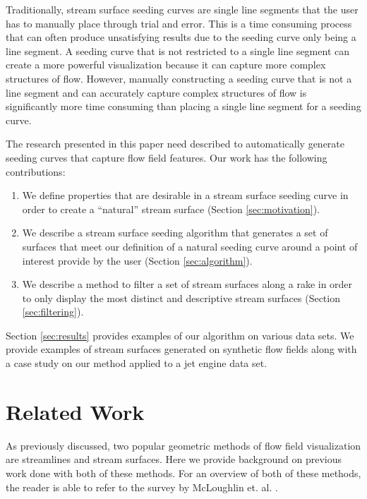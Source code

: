 \documentclass{vgtc}                          %
\begin{document}
Traditionally, stream surface seeding curves are single line segments that the user has to manually place through trial and error.
This is a time consuming process that can often produce unsatisfying results due to the seeding curve only being a line segment. 
A seeding curve that is not restricted to a single line segment can create a more powerful visualization because it can capture more complex structures of flow.
However, manually constructing a seeding curve that is not a line segment and can accurately capture complex structures of flow is significantly more time consuming than placing a single line segment for a seeding curve.

The research presented in this paper need described to automatically generate seeding curves that capture flow field features.
Our work has the following contributions:
\begin{enumerate}
\item We define properties that are desirable in a stream surface seeding curve in order to create a ``natural'' stream surface (Section \ref{sec:motivation}).
\item We describe a stream surface seeding algorithm that generates a set of surfaces that meet our definition of a natural seeding curve around a point of interest provide by the user (Section \ref{sec:algorithm}).
\item We describe a method to filter a set of stream surfaces along a rake in order to only display the most distinct and descriptive stream surfaces (Section \ref{sec:filtering}).
\end{enumerate}

Section \ref{sec:results} provides examples of our algorithm on various data sets.
We provide examples of stream surfaces generated on synthetic flow fields along with a case study on our method applied to a jet engine data set.


\section{Related Work}

As previously discussed, two popular geometric methods of flow field visualization are streamlines and stream surfaces.
Here we provide background on previous work done with both of these methods.
For an overview of both of these methods, the reader is able to refer to the survey by McLoughlin et. al. \cite{McLoughlin2009}.
\end{document}
